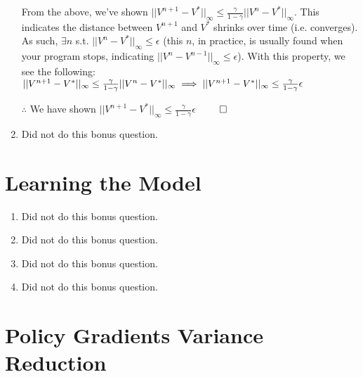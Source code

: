 \documentclass[11pt,english]{article}
\begin{document}
\begin{enumerate}
	From the above, we've shown $||V^{n+1} - V^*||_\infty \leq \frac{\gamma}{1-\gamma}||V^n - V^*||_\infty$. This indicates the distance between $V^{n+1}$ and $V^*$ shrinks over time (i.e. converges). As such, $\exists n$ s.t. $||V^n - V^*||_\infty \leq \epsilon$ (this $n$, in practice, is usually found when your program stops, indicating $||V^n - V^{n-1}||_\infty \leq \epsilon$). With this property, we see the following:\\
	
	$||V^{n+1} - V^*||_\infty \leq \frac{\gamma}{1-\gamma}||V^n - V^*||_\infty\\
	\implies ||V^{n+1} - V^*||_\infty \leq \frac{\gamma}{1-\gamma}\epsilon\\$
	
	$\therefore$ We have shown $||V^{n+1} - V^*||_\infty \leq \frac{\gamma}{1-\gamma}\epsilon$ $\qed$\pagebreak
	
	\item Did not do this bonus question.\pagebreak
\end{enumerate}

\section{Learning the Model}

\begin{enumerate}
	\item Did not do this bonus question.\pagebreak
	\item Did not do this bonus question.\pagebreak
	\item Did not do this bonus question.\pagebreak
	\item Did not do this bonus question.\pagebreak
\end{enumerate}

\section{Policy Gradients Variance Reduction}
\end{document}
